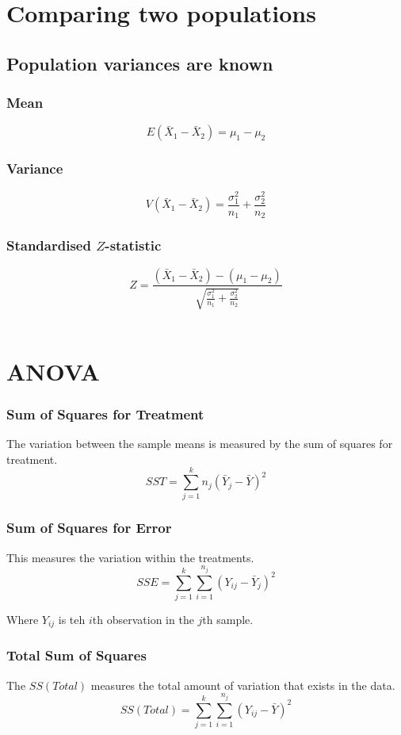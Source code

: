 \documentclass{article}
\begin{document}
\section{Comparing two populations}

\subsection{Population variances are known}

\subsubsection{Mean}
$$
E(\bar{X}_1 - \bar{X}_2) = \mu_1 - \mu_2
$$

\subsubsection{Variance}
$$
V(\bar{X}_1 - \bar{X}_2) = \frac{\sigma^2_1}{n_1} + \frac{\sigma^2_2}{n_2}
$$

\subsubsection{Standardised $Z$-statistic}
$$
Z = \frac{(\bar{X}_1 - \bar{X}_2) - (\mu_1 - \mu_2)}{\sqrt{\frac{\sigma^2_1}{n_1}+\frac{\sigma^2_2}{n_2}}}
$$
\\

\pagebreak

\section{ANOVA}

\subsubsection{Sum of Squares for Treatment}
The variation between the sample means is measured by the sum of squares for treatment.
$$
SST = \sum_{j=1}^k n_j(\bar{Y}_j - \bar{Y})^2
$$


\subsubsection{Sum of Squares for Error}
This measures the variation within the treatments.
$$
SSE = \sum_{j=1}^k \sum_{i=1}^{n_j} (Y_{ij} - \bar{Y}_j)^2
$$

Where $Y_{ij}$ is teh $i$th observation in the $j$th sample.

\subsubsection{Total Sum of Squares}
The $SS(Total)$ measures the total amount of variation that exists in the data.
$$
SS(Total) = \sum_{j=1}^k \sum_{i=1}^{n_j} (Y_{ij} - \bar{Y})^2
$$
\end{document}
